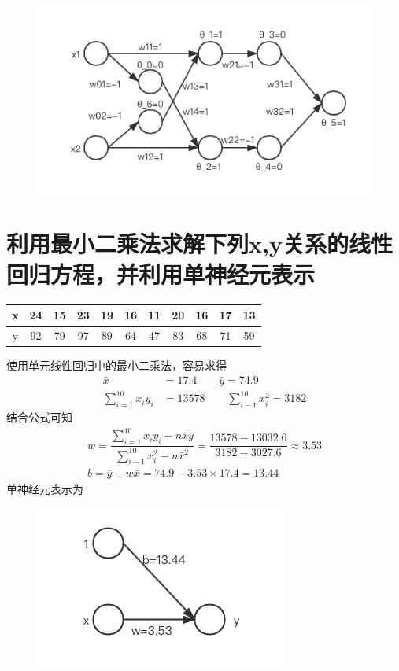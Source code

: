\documentclass{article}
\begin{document}
\begin{figure}[H]
	\centering
	\includegraphics[scale=0.8]{XOR.png}
\end{figure}



\newpage
\section{利用最小二乘法求解下列x,y关系的线性回归方程，并利用单神经元表示
}
	\begin{table}[h]
	\centering
	\label{tab:my_label}
	\begin{tabular}{|c|c|c|c|c|c|c|c|c|c|c|}
		\hline
		x & 24 & 15 & 23 & 19 & 16& 11& 20 &16 &17 &13\\
		\hline
		y & 92 & 79& 97& 89 & 64& 47& 83& 68& 71& 59\\
		\hline
	\end{tabular}
	
\end{table}
使用单元线性回归中的最小二乘法，容易求得
\begin{equation}
	\begin{aligned}
		\bar{x} &= 17.4 \qquad \bar{y} = 74.9\\
		\sum_{i=1}^{10}{x_{i}y_{i}}&=13578 \qquad \sum_{i-1}^{10}{x_{i}^{2}}=3182
	\end{aligned}
\end{equation}
结合公式可知
\begin{equation}
	\begin{aligned}
		w=\dfrac{\sum_{i=1}^{10}{x_{i}y_{i}}- n\bar{x}\bar{y}}{\sum_{i-1}^{10}{x_{i}^{2}}-n\bar{x}^{2}}=\dfrac{13578-13032.6}{3182 - 3027.6}\approx 3.53\\
		b=\bar{y}-w\bar{x}=74.9 - 3.53\times 17.4=13.44
	\end{aligned}
\end{equation}
单神经元表示为
\begin{figure}[H]
	\centering
	\includegraphics{LG.png}
\end{figure}
\end{document}
